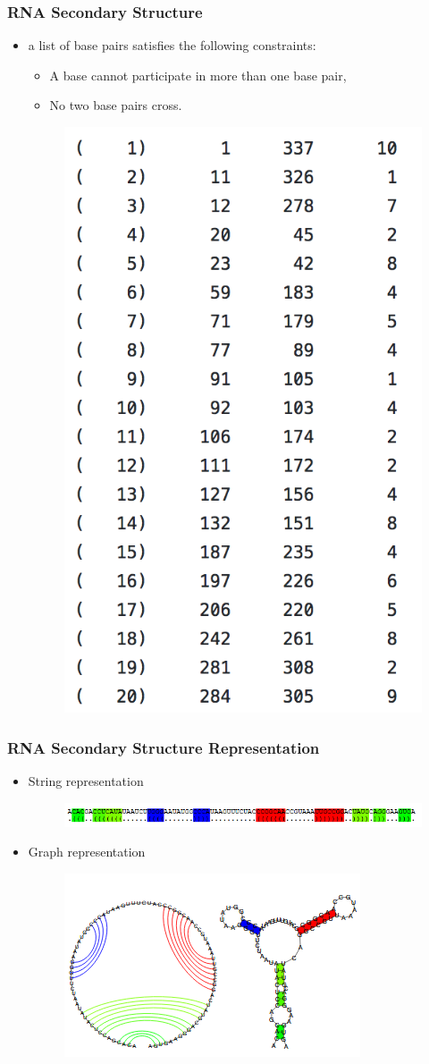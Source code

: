 \documentclass{beamer}
\begin{document}
\begin{frame}
\frametitle{RNA Secondary Structure}
\begin{itemize}
\item a list of base pairs satisfies the following constraints:
\begin{itemize}
\item A base cannot participate in more than one base pair,
\item No two base pairs cross.
\end{itemize}
\begin{figure}
	\includegraphics[width=0.35\linewidth]{BasePairs}
	\centering
\end{figure}
\end{itemize}
\end{frame}
\begin{frame}
\frametitle{RNA Secondary Structure Representation}
\begin{itemize}
\item String representation
\begin{figure}
	\includegraphics[width=1.0\linewidth]{RNAST1}
	\centering
\end{figure}
\item Graph representation
\begin{figure}
	\includegraphics[width=0.8\linewidth]{RNAST2}
	\centering
\end{figure}
\end{itemize}
\end{frame}
\end{document}

